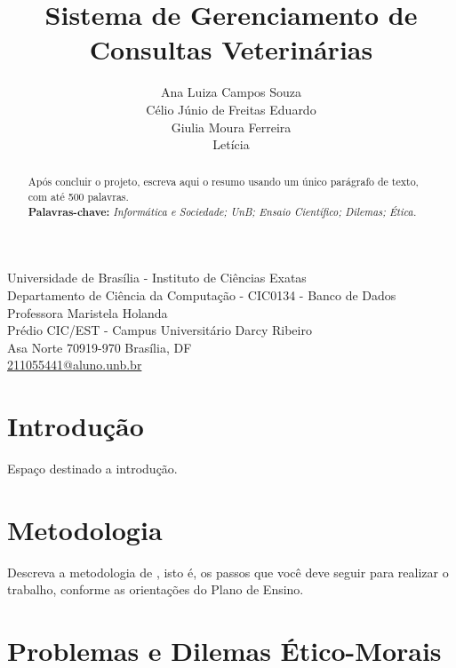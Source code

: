 \documentclass[12pt]{article}
\begin{document}
 

\title{Sistema de Gerenciamento de Consultas Veterinárias}
	
\author{Ana Luiza Campos Souza \\ Célio Júnio de Freitas Eduardo \\
Giulia Moura Ferreira \\ Letícia}
		
\newcommand{\address}{{
			\begin{center}
				\footnotesize
				Universidade de Brasília - Instituto de Ciências Exatas\\  Departamento de Ciência da Computação - CIC0134 - Banco de Dados \\
				Professora Maristela Holanda \\ Prédio CIC/EST - Campus Universitário Darcy Ribeiro \\Asa Norte 70919-970 Brasília, DF\\
				\href{seu-email@aluno.unb.br}{211055441@aluno.unb.br}
			\end{center}
}}
	
\maketitle
\address
	
\begin{abstract} 
		Após concluir o projeto, escreva aqui o resumo usando um único parágrafo de texto, com até 500 palavras. \\
\textbf{Palavras-chave:} \textit{Informática e Sociedade; UnB; Ensaio Científico; Dilemas; Ética.}
\end{abstract}

\section{Introdução}

Espaço destinado a introdução.

\section{Metodologia}

Descreva a metodologia de \cite{jones_doing_2016}, isto é, os passos que você deve seguir para realizar o trabalho, conforme as orientações do Plano de Ensino.

\section{Problemas e Dilemas Ético-Morais}
\end{document}
